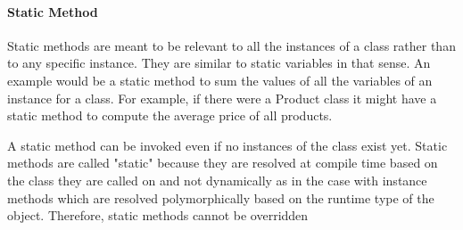 \documentclass{book}
\begin{document}
\paragraph{Static Method}

Static methods are meant to be relevant to all the instances of a class rather than to any specific instance. They are similar to static variables in that sense. An example would be a static method to sum the values of all the variables of an instance for a class. For example, if there were a Product class it might have a static method to compute the average price of all products.

A static method can be invoked even if no instances of the class exist yet. Static methods are called "static" because they are resolved at compile time based on the class they are called on and not dynamically as in the case with instance methods which are resolved polymorphically based on the runtime type of the object. Therefore, static methods cannot be overridden
\end{document}
